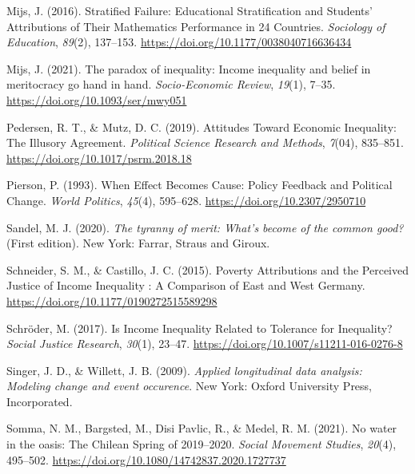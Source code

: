 \documentclass[
  12pt,
]{article}
\newlength{\cslhangindent}
\newenvironment{CSLReferences}[2] %
 {\begin{list}{}{%
  \setlength{\itemindent}{0pt}
  \setlength{\leftmargin}{0pt}
  \setlength{\parsep}{0pt}
  \ifodd #1
   \setlength{\leftmargin}{\cslhangindent}
   \setlength{\itemindent}{-1\cslhangindent}
  \fi
  \setlength{\itemsep}{#2\baselineskip}}}
 {\end{list}}
\begin{document}
\begin{CSLReferences}{1}{0}
Mijs, J. (2016). Stratified {Failure}: {Educational Stratification} and
{Students}' {Attributions} of {Their Mathematics Performance} in 24
{Countries}. \emph{Sociology of Education}, \emph{89}(2), 137--153.
\url{https://doi.org/10.1177/0038040716636434}

Mijs, J. (2021). The paradox of inequality: Income inequality and belief
in meritocracy go hand in hand. \emph{Socio-Economic Review},
\emph{19}(1), 7--35. \url{https://doi.org/10.1093/ser/mwy051}

Pedersen, R. T., \& Mutz, D. C. (2019). Attitudes {Toward Economic
Inequality}: {The Illusory Agreement}. \emph{Political Science Research
and Methods}, \emph{7}(04), 835--851.
\url{https://doi.org/10.1017/psrm.2018.18}

Pierson, P. (1993). When {Effect Becomes Cause}: {Policy Feedback} and
{Political Change}. \emph{World Politics}, \emph{45}(4), 595--628.
\url{https://doi.org/10.2307/2950710}

Sandel, M. J. (2020). \emph{The tyranny of merit: {What}'s become of the
common good?} (First edition). New York: {Farrar, Straus and Giroux}.

Schneider, S. M., \& Castillo, J. C. (2015). Poverty {Attributions} and
the {Perceived Justice} of {Income Inequality} : {A Comparison} of
{East} and {West Germany}.
\url{https://doi.org/10.1177/0190272515589298}

Schröder, M. (2017). Is {Income Inequality Related} to {Tolerance} for
{Inequality}? \emph{Social Justice Research}, \emph{30}(1), 23--47.
\url{https://doi.org/10.1007/s11211-016-0276-8}

Singer, J. D., \& Willett, J. B. (2009). \emph{Applied longitudinal data
analysis: Modeling change and event occurence}. New York: Oxford
University Press, Incorporated.

Somma, N. M., Bargsted, M., Disi Pavlic, R., \& Medel, R. M. (2021). No
water in the oasis: The {Chilean Spring} of 2019--2020. \emph{Social
Movement Studies}, \emph{20}(4), 495--502.
\url{https://doi.org/10.1080/14742837.2020.1727737}


\end{CSLReferences}
\end{document}
